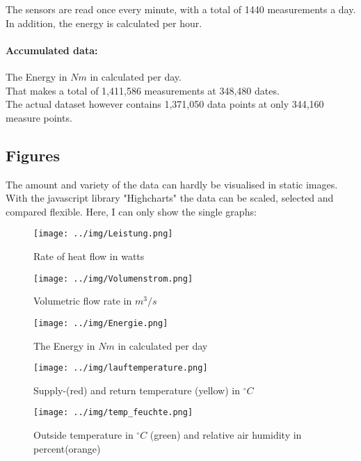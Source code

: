 \documentclass{scrartcl}
\begin{document}
The sensors are read once every minute, with a total of 1440 measurements a day. In addition, the energy is calculated per hour.\\

\paragraph{Accumulated data:}
The Energy in $Nm$ in calculated per day.\\

\noindent
That makes a total of 1,411,586 measurements at 348,480 dates.\\
The actual dataset however contains 1,371,050 data points at only 344,160 measure points.

\subsection{Figures}
The amount and variety of the data can hardly be visualised in static images. With the javascript library "Highcharts" the data can be scaled, selected and compared flexible. Here, I can only show the single graphs:

\begin{figure}[H]
  \centering
  \texttt{[image: ../img/Leistung.png]}
  \caption{Rate of heat flow in watts}
\end{figure}

\begin{figure}[H]
  \centering
  \texttt{[image: ../img/Volumenstrom.png]}
  \caption{Volumetric flow rate in $m^3 / s$}
\end{figure}


\begin{figure}[H]
  \centering
  \texttt{[image: ../img/Energie.png]}
  \caption{The Energy in $Nm$ in calculated per day}
\end{figure}

\begin{figure}[H]
  \centering
  \texttt{[image: ../img/lauftemperature.png]}
  \caption{Supply-(red) and return temperature (yellow) in $^\circ C$}
\end{figure}

\begin{figure}[H]
  \centering
  \texttt{[image: ../img/temp\_feuchte.png]}
  \caption{Outside temperature in $^\circ C$ (green) and relative air humidity in percent(orange)}
\end{figure}
\end{document}
